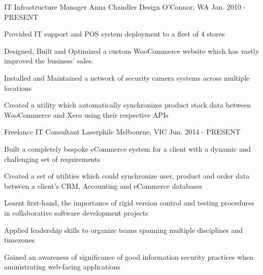 

\begin{cventries}

  \cventry
    {IT Infrastructure Manager} %
    {Anna Chandler Design} %
    {O'Connor, WA} %
    {Jan. 2010 - PRESENT} %
    {
      \begin{cvitems} %
        \item {Provided IT support and POS system deployment to a fleet of 4 stores}
        \item {Designed, Built and Optimized a custom WooCommerce website which has vastly improved the business’ sales.}
        \item {Installed and Maintained a network of security camera systems across multiple locations}
        \item {Created a utility which automatically synchronizes product stock data between WooCommerce and Xero using their respective APIs}
      \end{cvitems}
    }

  \cventry
    {Freelance IT Consultant} %
    {Laserphile} %
    {Melbourne, VIC} %
    {Jun. 2014 - PRESENT} %
    {
      \begin{cvitems} %
        \item {Built a completely bespoke eCommerce system for a client with a dynamic and challenging set of requirements}
        \item {Created a set of utilities which could synchronize user, product and order data between a client's CRM, Accounting and eCommerce databases}
        \item {Learnt first-hand, the importance of rigid version control and testing procedures in collaborative software development projects}
        \item {Applied leadership skills to organize teams spanning multiple disciplines and timezones}
        \item {Gained an awareness of significance of good information security practices when aministrating web-facing applications}
      \end{cvitems}
    }

\end{cventries}
